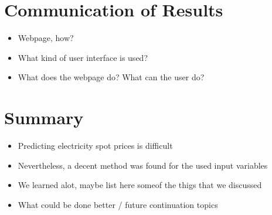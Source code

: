 \documentclass{article}
\numberwithin{equation}{section}
\begin{document}
\section{Communication of Results}
\begin{itemize}
	\item Webpage, how?
	\item What kind of user interface is used?
	\item What does the webpage do? What can the user do?
\end{itemize}

\section{Summary}
\begin{itemize}
	\item Predicting electricity spot prices is difficult
	\item Nevertheless, a decent method was found for the used input variables
	\item We learned alot, maybe list here someof the thigs that we discussed
	\item What could be done better / future continuation topics
\end{itemize}

\end{document}
